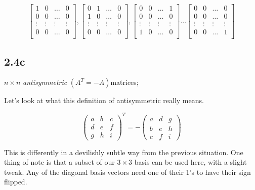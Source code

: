 \[
	\begin{bmatrix}
		1&0&\dots&0\\
		0&0&\dots&0\\
		\vdots & \vdots & \vdots & \vdots \\
		0&0&\dots&0\\
	\end{bmatrix},	
	\begin{bmatrix}
		0&1&\dots&0\\
		1&0&\dots&0\\
		\vdots & \vdots & \vdots & \vdots \\
		0&0&\dots&0\\
	\end{bmatrix},	
	\begin{bmatrix}
		0&0&\dots&1\\
		0&0&\dots&0\\
		\vdots & \vdots & \vdots & \vdots \\
		1&0&\dots&0\\
	\end{bmatrix} 
	\dots
	\begin{bmatrix}
		0&0&\dots&0\\
		0&0&\dots&0\\
		\vdots & \vdots & \vdots & \vdots \\
		0&0&\dots&1\\
	\end{bmatrix}
\]

\subsection*{2.4c} $n \times n$ \emph{antisymmetric} $\left( A^T = -A \right) $matrices;

Let's look at what this definition of antisymmetric really means. 

\[
	\begin{pmatrix}
		a & b & c \\
		d & e & f \\
		g & h & i
	\end{pmatrix}^T = 
	-\begin{pmatrix}
		a & d & g \\
		b & e & h \\
		c & f & i
	\end{pmatrix}
\]

This is differently in a devilishly subtle way from the previous situation. One thing of note is that a subset of our $3 \times 3$ basis can be used here, with a slight tweak. Any of the diagonal basis vectors need one of their 1's to have their sign flipped. 

